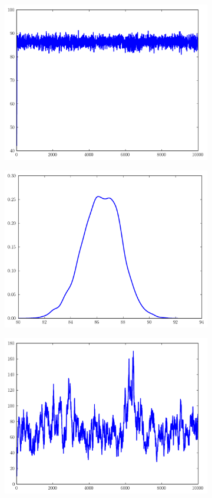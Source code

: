 \begin{figure}
	\begin{subfigure}[b]{.49\textwidth}
		\centering
		\includegraphics[width=\textwidth]{mu_traces.pdf}
	\end{subfigure}
	\begin{subfigure}[b]{.49\textwidth}
		\centering
		\includegraphics[width=.75\textwidth]{mu_kernel.pdf}
	\end{subfigure}
	\begin{subfigure}[b]{.49\textwidth}
		\centering
		\includegraphics[width=\textwidth]{sig_traces.pdf}

\end{subfigure}
\end{figure}
